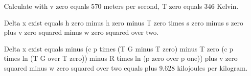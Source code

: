 Calculate with v zero equals 570 meters per second, T zero equals 346 Kelvin.

Delta x exist equals h zero minus h zero minus T zero times s zero minus s zero plus v zero squared minus w zero squared over two.

Delta x exist equals minus (c p times (T G minus T zero) minus T zero (c p times ln (T G over T zero)) minus R times ln (p zero over p one)) plus v zero squared minus w zero squared over two equals plus 9.628 kilojoules per kilogram.